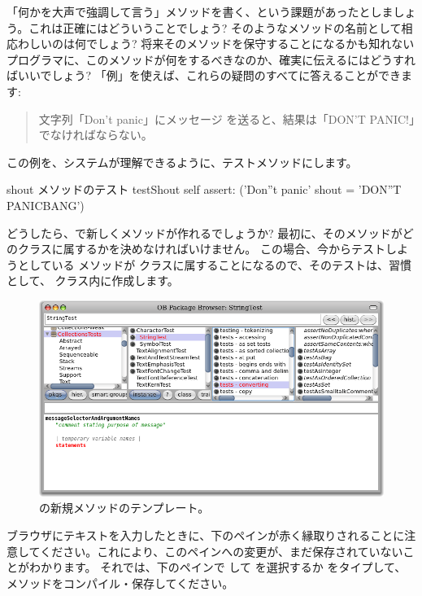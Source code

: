 \documentclass[a4paper,10pt,twoside]{book}
\begin{document}
「何かを大声で強調して言う」メソッドを書く、という課題があったとしましょう。これは正確にはどういうことでしょう? そのようなメソッドの名前として相応わしいのは何でしょう? 将来そのメソッドを保守することになるかも知れないプログラマに、このメソッドが何をするべきなのか、確実に伝えるにはどうすればいいでしょう? 「例」を使えば、これらの疑問のすべてに答えることができます:

\begin{quote}
文字列「Don't panic」にメッセージ  を送ると、結果は「DON'T PANIC!」でなければならない。
\end{quote}

\noindent
この例を、システムが理解できるように、テストメソッドにします。

\begin{method}[testShout]{shout メソッドのテスト}
testShout
	self assert: ('Don''t panic' shout = 'DON''T PANICBANG')
\end{method} %

どうしたら、\pharo で新しくメソッドが作れるでしょうか? 最初に、そのメソッドがどのクラスに属するかを決めなければいけません。
この場合、今からテストしようとしている  メソッドが  クラスに属することになるので、そのテストは、習慣として、 クラス内に作成します。

\begin{figure}[hbt]
\centerline {\includegraphics[width=\textwidth]{StringTest-newMethodTemplate}}
\caption{ の新規メソッドのテンプレート。
}
\end{figure}

ブラウザにテキストを入力したときに、下のペインが赤く縁取りされることに注意してください。これにより、このペインへの変更が、まだ保存されていないことがわかります。
それでは、下のペインで \actclick して  を選択するか  をタイプして、メソッドをコンパイル・保存してください。
\end{document}
